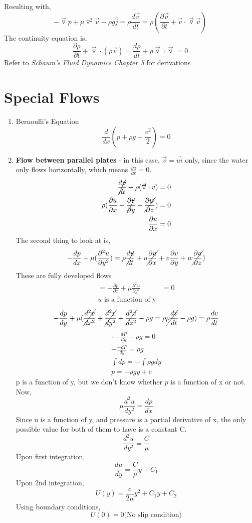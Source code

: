 \documentclass{report}
\begin{document}
Resulting with, 
\[
  - \vec{\triangledown}p + \mu \triangledown^2\vec{v} - \rho g \hat{j} = \rho \frac{d \vec{v}}{dt} = \rho (\frac{\partial \vec{v}}{\partial t} + \vec{v} \cdot \vec{\triangledown} \vec{v})
\]
The continuity equation is,
\[
  \frac{\partial \rho}{\partial t} + \vec{\triangledown} \cdot (\rho \vec{v}) = \frac{d \rho}{dt} + \rho \vec{\triangledown} \cdot \vec{\triangledown} = 0
\]
Refer to \textit{Schaum's Fluid Dynamics Chapter 5} for derivations
\section{Special Flows}
\begin{enumerate}
  \item Bernoulli's Equation \[
   \frac{d}{dx}(p + \rho g + \frac{v^2}{2})  = 0
  \]
\item \textbf{Flow between parallel plates} - in this case, $\vec{v} = u \hat{i}$ only, since the water only flows horizontally, which means $\frac{\partial u}{\partial x} = 0$. 
  \begin{align*}
    \cancel{\frac{d \rho}{d t}} + \rho (\vec{\triangledown} \cdot \vec{v}) = 0 \\ 
    \rho(\frac{\partial u}{\partial x} + \cancel{\frac{\partial v}{\partial y}} + \cancel{\frac{\partial w}{\partial z}}) = 0 \\
    \frac{\partial u}{\partial x} = 0
  \end{align*}
  The second thing to look at is, 
  \begin{align*}
    -\frac{dp}{dx} + \mu(\frac{\partial^2 u}{\partial y^2}) &= \rho \cancel{\frac{du}{dt}}+ u \cancel{\frac{\partial u}{\partial x}} + v \frac{\partial v}{\partial y} + w \cancel{\frac{\partial u}{\partial z}}) \\
  \end{align*}
  {These are fully developed flows}
  \begin{align*}
    =-\frac{\partial p}{\partial x} + \mu \frac{\partial^2 u}{\partial y^2} &= 0\\
    u \text{ is a function of y}
  \end{align*} 
  \[
    -\frac{d p}{dy} + \mu(\cancel{\frac{d^2v}{dx^2}}+ \cancel{\frac{d^2v}{dy^2}} + \cancel{\frac{d^2v}{dz^2}} - \rho g = \rho \cancel{\rho\frac{dv}{dt}} - \rho g) = \rho \frac{dv}{dt}
  \]
  \begin{align*}
    \therefore -\frac{dP}{dy} - \rho g = 0 \\
    - \frac{-d P}{dy} = \rho g \\
   \int d p = - \int \rho g dy  \\
    p = - \rho g y + c
  \end{align*}
  p is a function of y, but we don't know whether $p$ is a function of x or not. 
  Now, 
  \[
    \mu \frac{d^2 u}{dy^2} = \frac{dp}{dx}
  \]
  Since u is  a function of y, and pressure is a partial derivative of x, the only possible value for both of them to have is a constant C.
  \[
    \frac{d^2 u}{dy^2} = \frac{C}{\mu} 
  \]
  Upon first integration, 
  \[
    \frac{du}{dy} = \frac{C}{\mu} y + C_1 
  \]
  Upon 2nd integration,
  \[
    U(y) = \frac{c}{2\mu} y^2 + C_1 y + C_2
  \]
Using boundary conditions,
\[
  U(0) = 0 \text{(No slip condition)}
\]


\end{enumerate}
\end{document}
